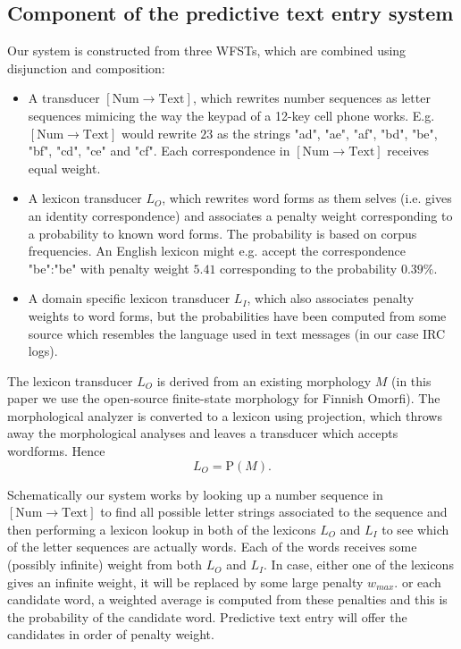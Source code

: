 \documentclass[a4paper,conference]{IEEEtran}
\begin{document}
\subsection{Component of the predictive text entry system}

Our system is constructed from three WFSTs, which are combined using
disjunction and composition:

\begin{itemize}
\item A transducer $[\mathrm{Num}\rightarrow\mathrm{Text}]$, which
  rewrites number sequences as letter sequences mimicing the way the
  keypad of a 12-key cell phone
  works. E.g. $[\mathrm{Num}\rightarrow\mathrm{Text}]$ would rewrite
  $23$ as the strings "ad", "ae", "af", "bd", "be", "bf", "cd", "ce"
  and "cf". Each correspondence in $[\mathrm{Num}\rightarrow\mathrm{Text}]$
  receives equal weight.
\item A lexicon transducer $L_O$, which rewrites word forms as them
  selves (i.e. gives an identity correspondence) and associates a
  penalty weight corresponding to a probability to known word
  forms. The probability is based on corpus frequencies. An English
  lexicon might e.g. accept the correspondence "be":"be" with penalty
  weight $5.41$ corresponding to the probability $0.39\%$.
\item A domain specific lexicon transducer $L_I$, which also
  associates penalty weights to word forms, but the probabilities have
  been computed from some source which resembles the language used in
  text messages (in our case IRC logs).
\end{itemize}

The lexicon transducer $L_O$ is derived from an existing morphology $M$
(in this paper we use the open-source finite-state morphology for
Finnish Omorfi). The morphological analyzer is converted to a lexicon
using projection, which throws away the morphological analyses and
leaves a transducer which accepts wordforms. Hence 
\begin{equation}L_O = \mathrm{P}(M)\text{.}\end{equation}

Schematically our system works by looking up a number sequence in
$[\mathrm{Num}\rightarrow\mathrm{Text}]$ to find all possible letter
strings associated to the sequence and then performing a lexicon
lookup in both of the lexicons $L_O$ and $L_I$ to see which of the
letter sequences are actually words. Each of the words receives some
(possibly infinite) weight from both $L_O$ and $L_I$. In case, either
one of the lexicons gives an infinite weight, it will be replaced by
some large penalty $w_{max}$. or each candidate word, a weighted
average is computed from these penalties and this is the probability
of the candidate word. Predictive text entry will offer the candidates
in order of penalty weight.
\end{document}
